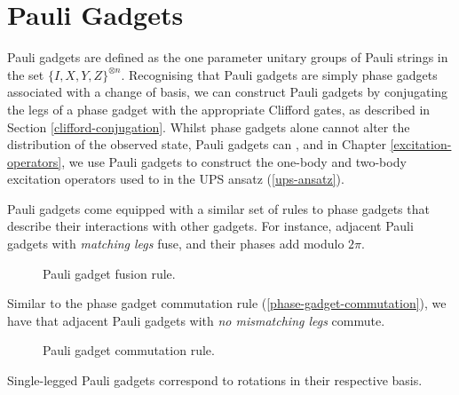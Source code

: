 \section{Pauli Gadgets}%
\label{pauli-gadgets-section}

Pauli gadgets are defined as the one parameter unitary groups of Pauli strings in the set $\{I, X, Y, Z\}^{\otimes n}$. Recognising that Pauli gadgets are simply phase gadgets associated with a change of basis, we can construct Pauli gadgets by conjugating the legs of a phase gadget with the appropriate Clifford gates, as described in Section \ref{clifford-conjugation}. Whilst phase gadgets alone cannot alter the distribution of the observed state, Pauli gadgets can \cite{Yeung2020}, and in Chapter \ref{excitation-operators}, we use Pauli gadgets to construct the one-body and two-body excitation operators used to in the UPS ansatz (\ref{ups-ansatz}).


Pauli gadgets come equipped with a similar set of rules to phase gadgets that describe their interactions with other gadgets. For instance, adjacent Pauli gadgets with \textit{matching legs} fuse, and their phases add modulo $2\pi$.

\begin{figure}[H]
    \centering
    \caption{Pauli gadget fusion rule.}
    \label{pauli-gadget-fusion}
\end{figure}

Similar to the phase gadget commutation rule (\ref{phase-gadget-commutation}), we have that adjacent Pauli gadgets with \textit{no mismatching legs} commute.

\begin{figure}[H]
    \centering
    \caption{Pauli gadget commutation rule.}
    \label{pauli-gadget-commutation}
\end{figure}

Single-legged Pauli gadgets correspond to rotations in their respective basis.

\vspace{5pt}


